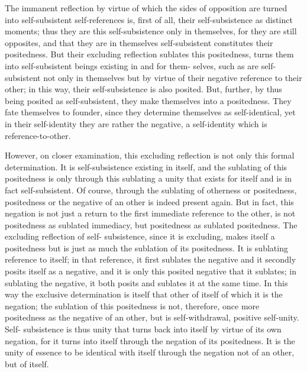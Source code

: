 The immanent reflection by virtue of which the sides of opposition are
turned into self-subsistent self-references is, first of all, their self-subsistence
as distinct moments; thus they are this self-subsistence only in themselves,
for they are still opposites, and that they are in themselves self-subsistent
constitutes their positedness. But their excluding reflection sublates this
positedness, turns them into self-subsistent beings existing in and for them-
selves, such as are self-subsistent not only in themselves but by virtue of their
negative reference to their other; in this way, their self-subsistence is also
posited. But, further, by thus being posited as self-subsistent, they make
themselves into a positedness. They fate themselves to founder, since they
determine themselves as self-identical, yet in their self-identity they are
rather the negative, a self-identity which is reference-to-other.

However, on closer examination, this excluding reflection is not only
this formal determination. It is self-subsistence existing in itself, and the
sublating of this positedness  is only through this sublating a unity that
exists for itself and is in fact self-subsistent. Of course, through the sublating
of otherness or positedness, positedness or the negative of an other is indeed
present again. But in fact, this negation is not just a return to the first
immediate reference to the other, is not positedness as sublated immediacy,
but positedness as sublated positedness. The excluding reflection of self-
subsistence, since it is excluding, makes itself a positedness but is just as
much the sublation of its positedness. It is sublating reference to itself; in
that reference, it first sublates the negative and it secondly posits itself as a
negative, and it is only this posited negative that it sublates; in sublating
the negative, it both posits and sublates it at the same time. In this way the
exclusive determination is itself that other of itself of which it is the negation;
the sublation of this positedness is not, therefore, once more positedness
as the negative of an other, but is self-withdrawal, positive self-unity. Self-
subsistence is thus unity that turns back into itself by virtue of its own
negation, for it turns into itself through the negation of its positedness. It
is the unity of essence  to be identical with itself through the negation not
of an other, but of itself.

